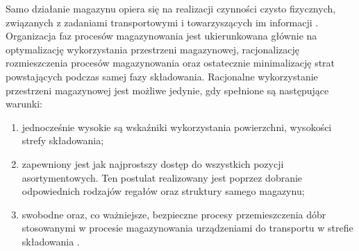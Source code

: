 	Samo działanie magazynu opiera się na realizacji czynności czysto fizycznych, związanych z zadaniami transportowymi 
	i towarzyszących im informacji \cite{PZMW}. Organizacja faz procesów magazynowania jest ukierunkowana głównie na
	optymalizację wykorzystania przestrzeni magazynowej, racjonalizację rozmieszczenia procesów magazynowania oraz
	ostatecznie minimalizację strat powstających podczas samej fazy składowania. Racjonalne wykorzystanie
	przestrzeni magazynowej jest możliwe jedynie, gdy spełnione są następujące warunki:
	\begin{enumerate}
		\item jednocześnie wysokie są wskaźniki wykorzystania powierzchni, wysokości strefy składowania;
		\item zapewniony jest jak najprostszy dostęp do wszystkich pozycji asortymentowych. Ten postulat
		realizowany jest poprzez dobranie odpowiednich rodzajów regałów oraz struktury samego magazynu;
		\item swobodne oraz, co ważniejsze, bezpieczne procesy przemieszczenia dóbr stosowanymi
		w procesie magazynowania urządzeniami do transportu w strefie składowania \cite{logistyka_w_przedsiebiorstwie}.
	\end{enumerate}
